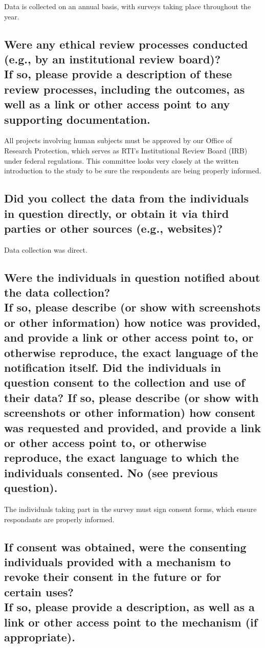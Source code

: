 \documentclass[letterpaper, 10 pt, conference]{ieeeconf}  %
\newcommand{\subtitle}[1]{{\\ \small \normalfont \color{purple} #1}}
\begin{document}
Data is collected on an annual basis, with surveys taking place throughout the year.

\subsection{Were any ethical review processes conducted (e.g., by an institutional review board)? \subtitle{If so, please provide a description of these review processes, including the outcomes, as well as a link or other access point to any supporting documentation.}}

All projects involving human subjects must be approved by our Office of Research Protection, which serves as RTI’s Institutional Review Board (IRB) under federal regulations. This committee looks very closely at the written introduction to the study to
be sure the respondents are being properly informed.

\subsection{Did you collect the data from the individuals in question directly, or obtain it via third parties or other sources (e.g., websites)?}

Data collection was direct.

\subsection{Were the individuals in question notified about the data collection? \subtitle{If so, please describe (or show with screenshots or other information) how notice was provided, and provide a link or other access point to, or otherwise reproduce, the exact language of the notification itself. Did the individuals in question consent to the collection and use of their data? If so, please describe (or show with screenshots or other information) how consent was requested and provided, and provide a link or other access point to, or otherwise reproduce, the exact language to which the individuals consented. No (see previous question).}}

The individuals taking part in the survey must sign consent forms, which ensure respondants are properly informed.

\subsection{If consent was obtained, were the consenting individuals provided with a mechanism to revoke their consent in the future or for certain uses? \subtitle{If so, please provide a description, as well as a link or other access point to the mechanism (if appropriate).}}
\end{document}
